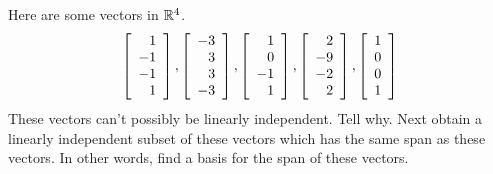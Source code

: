 \begin{enumialphparenastyle}
\begin{ex} Here are some vectors in $\mathbb{R}^{4}$. 
\begin{equation*}
\left[ 
\begin{array}{r}
1 \\ 
-1 \\ 
-1 \\ 
1
\end{array}
\right] ,\left[ 
\begin{array}{r}
-3 \\ 
3 \\ 
3 \\ 
-3
\end{array}
\right] ,\left[ 
\begin{array}{r}
1 \\ 
0 \\ 
-1 \\ 
1
\end{array}
\right] ,\left[ 
\begin{array}{r}
2 \\ 
-9 \\ 
-2 \\ 
2
\end{array}
\right] ,\left[ 
\begin{array}{r}
1 \\ 
0 \\ 
0 \\ 
1
\end{array}
\right] 
\end{equation*}
These vectors can't possibly be linearly independent. Tell why. Next obtain a
linearly independent subset of these vectors which has the same span as
these vectors. In other words, find a basis for the span of these vectors.
\end{ex}


\end{enumialphparenastyle}
